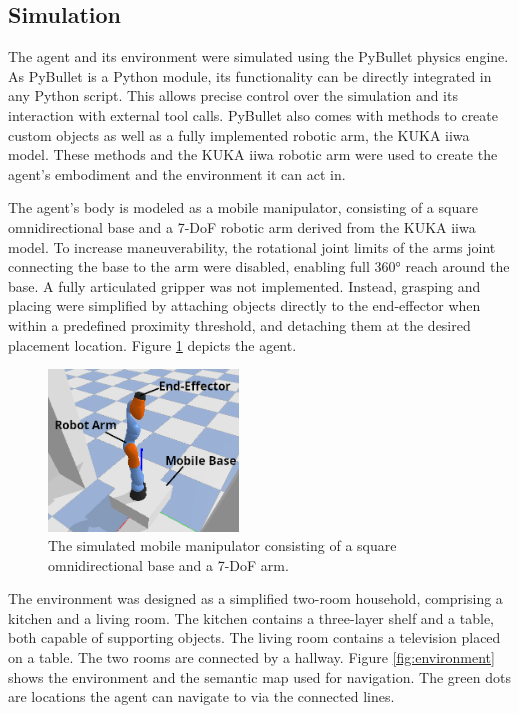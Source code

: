 \documentclass[../report.tex]{subfiles}
\begin{document}
\subsection{Simulation}
The agent and its environment were simulated using the PyBullet physics engine. As PyBullet is a Python module, its functionality can be directly integrated in any Python script. This allows precise control over the simulation and its interaction with external tool calls. PyBullet also comes with methods to create custom objects as well as a fully implemented robotic arm, the KUKA iiwa model. These methods and the KUKA iiwa robotic arm were used to create the agent's embodiment and the environment it can act in.

The agent's body is modeled as a mobile manipulator, consisting of a square omnidirectional base and a 7-DoF robotic arm derived from the KUKA iiwa model.
To increase maneuverability, the rotational joint limits of the arms joint connecting the base to the arm were disabled, enabling full 360° reach around the base. A fully articulated gripper was not implemented. Instead, grasping and placing were simplified by attaching objects directly to the end-effector when within a predefined proximity threshold, and detaching them at the desired placement location. Figure \ref{fig:agent} depicts the agent.

\begin{figure}[h!]
	\centering
	\includegraphics[width=0.45\textwidth]{figures/agent.png}
	\caption{The simulated mobile manipulator consisting of a square omnidirectional base and a 7-DoF arm.}
	\label{fig:agent}
\end{figure}

The environment was designed as a simplified two-room household, comprising a kitchen and a living room. The kitchen contains a three-layer shelf and a table, both capable of supporting objects. The living room contains a television placed on a table. The two rooms are connected by a hallway. Figure \ref{fig:environment} shows the environment and the semantic map used for navigation. The green dots are locations the agent can navigate to via the connected lines.
\end{document}
